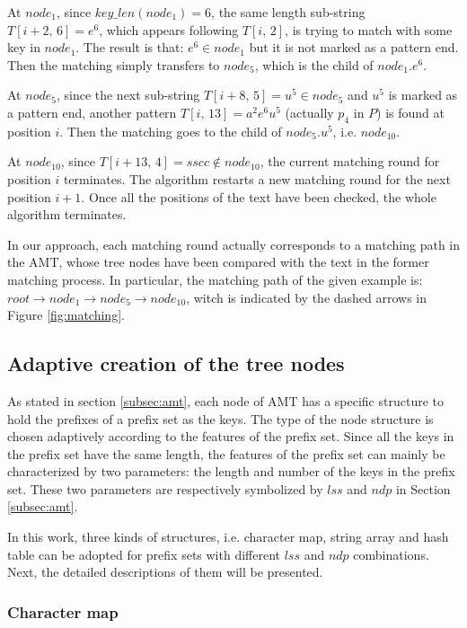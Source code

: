\documentclass{article}
\begin{document}
At $node_1$, since $key\_len(node_1)=6$, the same length sub-string
$T[i+2,\,6]=e^6$, which appears following $T[i,\,2]$, is trying to
match with some key in $node_1$. The result is that: $e^6 \in node_1$
but it is not marked as a pattern end. Then the matching simply
transfers to $node_5$, which is the child of $node_1.e^6$.

At $node_5$, since the next sub-string $T[i+8,\,5]=u^5 \in node_5$ and
$u^5$ is marked as a pattern end, another pattern
$T[i,\,13]=a^2e^6u^5$ (actually $p_4$ in $P$) is found at position
$i$. Then the matching goes to the child of $node_5.u^5$, i.e.
$node_{10}$.

At $node_{10}$, since $T[i+13,\,4]=sscc \notin node_{10}$, the current
matching round for position $i$ terminates. The algorithm restarts a
new matching round for the next position $i+1$. Once all the positions
of the text have been checked, the whole algorithm terminates.

In our approach, each matching round actually corresponds to a
\textsf{matching path} in the AMT, whose tree nodes have been compared
with the text in the former matching process. In particular, the
matching path of the given example is:
$root \rightarrow node_1 \rightarrow node_5 \rightarrow node_{10}$,
witch is indicated by the dashed arrows in Figure \ref{fig:matching}.


\subsection{Adaptive creation of the tree nodes}
\label{subsec:nodes}

As stated in section \ref{subsec:amt}, each node of AMT has a specific
structure to hold the prefixes of a prefix set as the keys. The type
of the node structure is chosen adaptively according to the features
of the prefix set. Since all the keys in the prefix set have the same
length, the features of the prefix set can mainly be characterized by
two parameters: the \textsf{length} and \textsf{number} of the keys in
the prefix set. These two parameters are respectively symbolized by
$lss$ and $ndp$ in Section \ref{subsec:amt}.

In this work, three kinds of structures, i.e. \textsf{character map},
\textsf{string array} and \textsf{hash table} can be adopted for
prefix sets with different $lss$ and $ndp$ combinations. Next, the
detailed descriptions of them will be presented.

\subsubsection{Character map}
\end{document}
